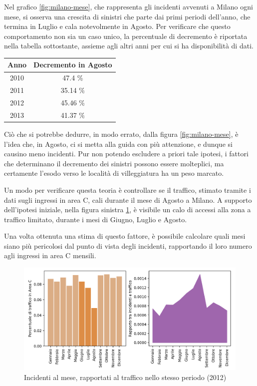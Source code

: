 \documentclass[a4paper]{report}
\begin{document}
Nel grafico \ref{fig:milano-mese}, che rappresenta gli incidenti avvenuti a Milano ogni mese, 
si osserva una crescita di sinistri che parte dai primi periodi 
dell'anno, che termina in Luglio e cala notevolmente in Agosto. 
Per verificare che questo comportamento non sia 
un caso unico, la percentuale di decremento è riportata nella tabella sottostante, 
assieme agli altri anni per cui si ha disponibilità di dati. 

\begin{center}
    \def\arraystretch{1.5}%
    \begin{tabular}{ |c|c| } 
        \hline
        Anno & Decremento in Agosto \\ 
        \hline
        2010 & 47.4 \%  \\ 
        \rowcolor{TableGray}
        2011 & 35.14 \% \\
        2012 & 45.46 \% \\
        \rowcolor{TableGray}
        2013 & 41.37 \% \\
        \hline
    \end{tabular}
\end{center}

Ciò che si potrebbe dedurre, in modo errato, dalla figura \ref{fig:milano-mese}, 
è l'idea che, in Agosto, ci si metta alla guida con più attenzione, 
e dunque si causino meno incidenti. 
Pur non potendo escludere a priori tale ipotesi, i fattori che determinano 
il decremento dei sinistri possono essere molteplici, 
ma certamente l'esodo verso le località di villeggiatura ha un peso marcato.

Un modo per verificare questa teoria è controllare se il traffico, 
stimato tramite i dati sugli ingressi in area C, cali durante il mese di 
Agosto a Milano. 
A supporto dell'ipotesi iniziale, nella figura sinistra \ref{fig:incidenti-traffico-mese}, 
è visibile un calo di accessi alla zona a traffico limitato, 
durante i mesi di Giugno, Luglio e Agosto. 

Una volta ottenuta una stima di questo fattore, è possibile calcolare quali mesi 
siano più pericolosi dal punto di vista degli incidenti, 
rapportando il loro numero agli ingressi in area C mensili.

\begin{figure}
    \includegraphics[width=\linewidth]{../src/area_c/rapporto_mese.png}
    \caption{Incidenti al mese, rapportati al traffico nello stesso periodo (2012)}
    \label{fig:incidenti-traffico-mese}
\end{figure}
\end{document}
